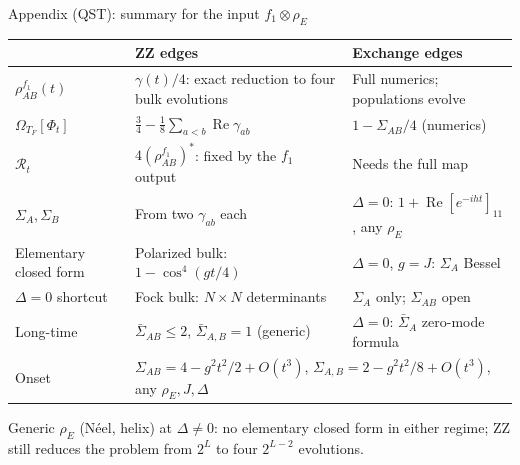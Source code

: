 \documentclass[aspectratio=169,10pt]{beamer}
\newcommand{\noteinline}[1]{{\color{muted}\footnotesize #1}}
\begin{document}
\begin{frame}{Appendix (QST): summary for the input \(f_1\otimes\rho_E\)}
\renewcommand{\arraystretch}{1.25}
\footnotesize
\begin{tabular}{@{}p{}p{}p{}@{}}
\toprule
 & \textbf{ZZ edges} & \textbf{Exchange edges}\\
\midrule
\(\rho^{f_1}_{AB}(t)\) & \(\gamma(t)/4\): exact reduction to four bulk evolutions & Full numerics; populations evolve\\
\(\Omega_{T_F}[\Phi_t]\) & \(\tfrac34-\tfrac18\sum_{a<b}\operatorname{Re}\gamma_{ab}\) & \(1-\Sigma_{AB}/4\) (numerics)\\
\(\mathcal R_t\) & \(4(\rho^{f_1}_{AB})^*\): fixed by the \(f_1\) output & Needs the full map\\
\(\Sigma_A,\Sigma_B\) & From two \(\gamma_{ab}\) each & \(\Delta=0\): \(1+\operatorname{Re}[e^{-iht}]_{11}\), any \(\rho_E\)\\
Elementary closed form & Polarized bulk: \(1-\cos^4(gt/4)\) & \(\Delta=0\), \(g=J\): \(\Sigma_A\) Bessel\\
\(\Delta=0\) shortcut & Fock bulk: \(N\times N\) determinants & \(\Sigma_A\) only; \(\Sigma_{AB}\) open\\
Long-time & \(\bar\Sigma_{AB}\le2\), \(\bar\Sigma_{A,B}=1\) (generic) & \(\Delta=0\): \(\bar\Sigma_A\) zero-mode formula\\
Onset & \multicolumn{2}{l}{\(\Sigma_{AB}=4-g^2t^2/2+O(t^3)\), \(\Sigma_{A,B}=2-g^2t^2/8+O(t^3)\), any \(\rho_E,J,\Delta\)}\\
\bottomrule
\end{tabular}
\vspace{.2cm}

\noteinline{Generic \(\rho_E\) (N\'eel, helix) at \(\Delta\neq0\): no elementary closed form in either regime; ZZ still reduces the problem from \(2^L\) to four \(2^{L-2}\) evolutions.}
\end{frame}
\end{document}
